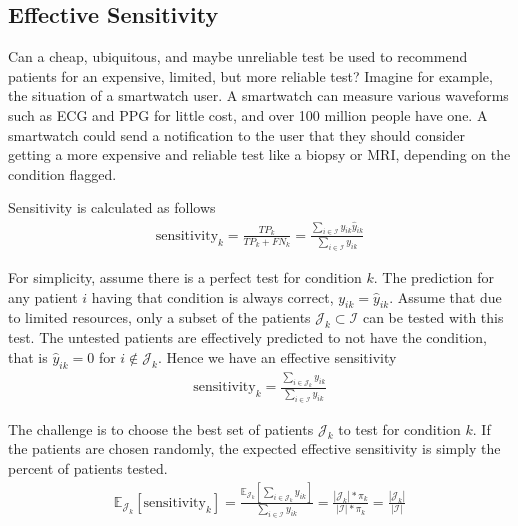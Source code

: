 \pagebreak
\subsection{Effective Sensitivity}

Can a cheap, ubiquitous, and maybe unreliable test be used to recommend patients for an expensive, limited, but more reliable test?  Imagine for example, the situation of a smartwatch user.  A smartwatch can measure various waveforms such as ECG and PPG for little cost, and over 100 million people have one.  A smartwatch could send a notification to the user that they should consider getting a more expensive and reliable test like a biopsy or MRI, depending on the condition flagged.

Sensitivity is calculated as follows
\begin{gather}
    \text{sensitivity}_k 
        = \frac{TP_k}{TP_k + FN_k}
        = \frac
            {\sum_{i \in \mathcal{I}} y_{ik} \hat{y}_{ik}}
            {\sum_{i \in \mathcal{I}} y_{ik}}
\end{gather}

For simplicity, assume there is a perfect test for condition $k$.  The prediction for any patient $i$ having that condition is always correct, $y_{ik} = \hat{y}_{ik}$.  Assume that due to limited resources, only a subset of the patients $\mathcal{J}_k \subset \mathcal{I}$ can be tested with this test. The untested patients are effectively predicted to not have the condition, that is $\hat{y}_{ik} = 0$ for $i \notin \mathcal{J}_k$.  Hence we have an effective sensitivity
\begin{gather}
    \text{sensitivity}_k = \frac
        {\sum_{i \in \mathcal{J}_k} y_{ik}}
        {\sum_{i \in \mathcal{I}} y_{ik}}
\end{gather}

The challenge is to choose the best set of patients $\mathcal{J}_k$ to test for condition $k$.  If the patients are chosen randomly, the expected effective sensitivity is simply the percent of patients tested.
\begin{gather}
    \mathbb{E}_{\mathcal{J}_k}[\text{sensitivity}_k]
        = \frac
            {\mathbb{E}_{\mathcal{J}_k}[\sum_{i \in \mathcal{J}_k} y_{ik}]}
            {\sum_{i \in \mathcal{I}} y_{ik}}
        = \frac{|\mathcal{J}_k| * \pi_k}{|\mathcal{I}| * \pi_k} 
        = \frac{|\mathcal{J}_k|}{|\mathcal{I}|} 
\end{gather}

